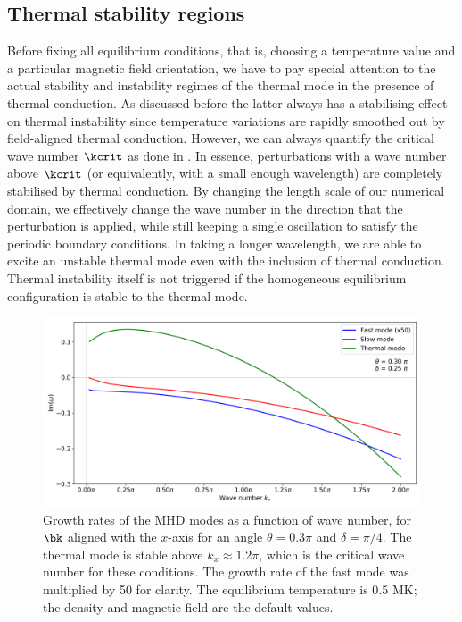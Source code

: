 \subsection{Thermal stability regions}
Before fixing all equilibrium conditions, that is, choosing a temperature value and a particular magnetic field orientation, we have to pay special attention to the actual stability and instability regimes of the thermal mode in the presence of thermal conduction. As discussed before the latter always has a stabilising effect on thermal instability since temperature variations are rapidly smoothed out by field-aligned thermal conduction. However, we can always quantify the critical wave number $\kcrit$ as done in \citet{field1965}. In essence, perturbations with a wave number above $\kcrit$ (or equivalently, with a small enough wavelength) are completely stabilised by thermal conduction. By changing the length scale of our numerical domain, we effectively change the wave number in the direction that the perturbation is applied, while still keeping a single oscillation to satisfy the periodic boundary conditions. In taking a longer wavelength, we are able to excite an unstable thermal mode even with the inclusion of thermal conduction. Thermal instability itself is not triggered if the homogeneous equilibrium configuration is stable to the thermal mode.

\begin{figure}[b]
  \centering
  \includegraphics[width=\textwidth]{w_vs_kx.png}
  \caption{
    Growth rates of the MHD modes as a function of wave number, for $\bk$ aligned with the $x$-axis for an angle $\theta = 0.3\pi$ and $\delta = \pi/4$. The thermal mode is stable above $k_x \approx 1.2\pi$, which is the critical wave number for these conditions. The growth rate of the fast mode was multiplied by 50 for clarity. The equilibrium temperature is 0.5 MK; the density and magnetic field are the default values.
  }
  \label{fig: w_vs_kx}
\end{figure}

